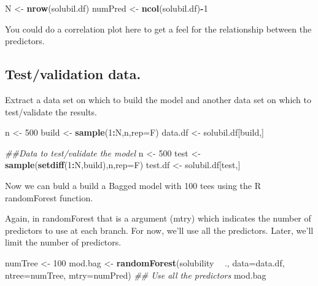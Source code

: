 \documentclass[]{article}
\newenvironment{Shaded}{\begin{snugshade}}{\end{snugshade}}
\newcommand{\CommentTok}[1]{\textcolor[rgb]{0.56,0.35,0.01}{\textit{#1}}}
\newcommand{\DataTypeTok}[1]{\textcolor[rgb]{0.13,0.29,0.53}{#1}}
\newcommand{\DecValTok}[1]{\textcolor[rgb]{0.00,0.00,0.81}{#1}}
\newcommand{\KeywordTok}[1]{\textcolor[rgb]{0.13,0.29,0.53}{\textbf{#1}}}
\newcommand{\NormalTok}[1]{#1}
\newcommand{\OperatorTok}[1]{\textcolor[rgb]{0.81,0.36,0.00}{\textbf{#1}}}
\newcommand{\StringTok}[1]{\textcolor[rgb]{0.31,0.60,0.02}{#1}}
\begin{document}
\begin{Shaded}
\begin{Highlighting}[]
\NormalTok{N <-}\StringTok{ }\KeywordTok{nrow}\NormalTok{(solubil.df)}
\NormalTok{numPred <-}\StringTok{ }\KeywordTok{ncol}\NormalTok{(solubil.df)}\OperatorTok{-}\DecValTok{1}
\end{Highlighting}
\end{Shaded}

You could do a correlation plot here to get a feel for the relationship
between the predictors.

\hypertarget{testvalidation-data.}{%
\subsection{Test/validation data.}\label{testvalidation-data.}}

Extract a data set on which to build the model and another data set on
which to test/validate the results.

\begin{Shaded}
\begin{Highlighting}[]
\NormalTok{n <-}\StringTok{ }\DecValTok{500}
\NormalTok{build <-}\StringTok{ }\KeywordTok{sample}\NormalTok{(}\DecValTok{1}\OperatorTok{:}\NormalTok{N,n,}\DataTypeTok{rep=}\NormalTok{F)}
\NormalTok{data.df <-}\StringTok{ }\NormalTok{solubil.df[build,]}

\CommentTok{##Data to test/validate the model}
\NormalTok{n <-}\StringTok{ }\DecValTok{500}
\NormalTok{test <-}\StringTok{ }\KeywordTok{sample}\NormalTok{(}\KeywordTok{setdiff}\NormalTok{(}\DecValTok{1}\OperatorTok{:}\NormalTok{N,build),n,}\DataTypeTok{rep=}\NormalTok{F)}
\NormalTok{test.df <-}\StringTok{ }\NormalTok{solubil.df[test,]}
\end{Highlighting}
\end{Shaded}

Now we can buld a build a Bagged model with 100 tees using the R
randomForest function.

Again, in randomForest that is a argument (mtry) which indicates the
number of predictors to use at each branch. For now, we'll use all the
predictors. Later, we'll limit the number of predictors.

\begin{Shaded}
\begin{Highlighting}[]
\NormalTok{numTree <-}\StringTok{ }\DecValTok{100}
\NormalTok{mod.bag <-}\StringTok{ }\KeywordTok{randomForest}\NormalTok{(solubility }\OperatorTok{~}\StringTok{ }\NormalTok{.,}
                        \DataTypeTok{data=}\NormalTok{data.df,}
                        \DataTypeTok{ntree=}\NormalTok{numTree,}
                        \DataTypeTok{mtry=}\NormalTok{numPred)  }\CommentTok{## Use all the predictors}
\NormalTok{mod.bag}
\end{Highlighting}
\end{Shaded}
\end{document}
